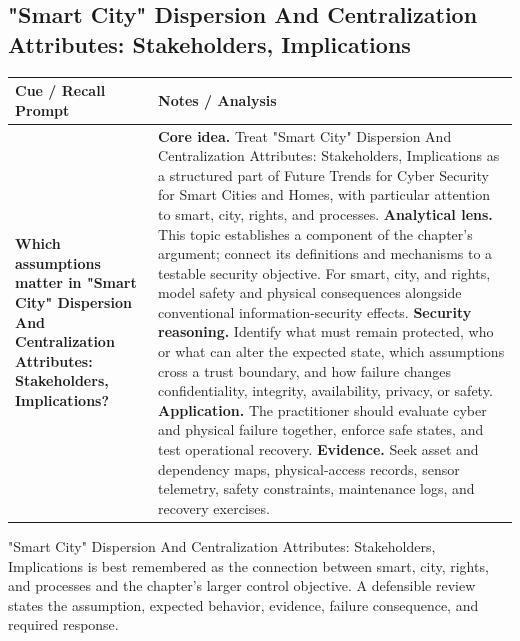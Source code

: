 \documentclass[11pt]{article}
\newcommand{\CornellHeader}{%
\rowcolor{Navy}\color{white}\bfseries Cue / Recall Prompt & \color{white}\bfseries Notes / Analysis\\\hline}
\newcommand{\CornellRow}[2]{%
\cellcolor{CueGray}\RaggedRight\textbf{#1} & \RaggedRight #2\\\hline}
\begin{document}
\subsection*{"Smart City" Dispersion And Centralization Attributes: Stakeholders, Implications}
\begin{longtable}{>{\RaggedRight\arraybackslash}p{}|>{\RaggedRight\arraybackslash}p{}}
\CornellHeader
\CornellRow{Which assumptions matter in "Smart City" Dispersion And Centralization Attributes: Stakeholders, Implications?}{\textbf{Core idea.} Treat "Smart City" Dispersion And Centralization Attributes: Stakeholders, Implications as a structured part of Future Trends for Cyber Security for Smart Cities and Homes, with particular attention to smart, city, rights, and processes. \textbf{Analytical lens.} This topic establishes a component of the chapter's argument; connect its definitions and mechanisms to a testable security objective. For smart, city, and rights, model safety and physical consequences alongside conventional information-security effects. \textbf{Security reasoning.} Identify what must remain protected, who or what can alter the expected state, which assumptions cross a trust boundary, and how failure changes confidentiality, integrity, availability, privacy, or safety. \textbf{Application.} The practitioner should evaluate cyber and physical failure together, enforce safe states, and test operational recovery. \textbf{Evidence.} Seek asset and dependency maps, physical-access records, sensor telemetry, safety constraints, maintenance logs, and recovery exercises.}
\end{longtable}
\begin{topicsummary}
"Smart City" Dispersion And Centralization Attributes: Stakeholders, Implications is best remembered as the connection between smart, city, rights, and processes and the chapter's larger control objective. A defensible review states the assumption, expected behavior, evidence, failure consequence, and required response.
\end{topicsummary}
\end{document}
